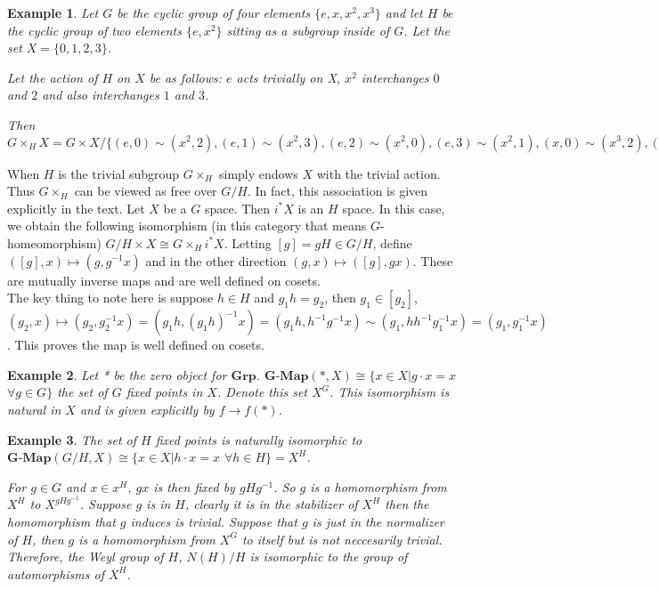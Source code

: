 \documentclass{article}
\theoremstyle{problemstyle}
\theoremstyle{problemstyle}
\theoremstyle{problemstyle}
\newtheorem{example}{Example}
\theoremstyle{problemstyle}
\theoremstyle{problemstyle}
\theoremstyle{problemstyle}
\begin{document}
\begin{example}
Let $G$ be the cyclic group of four elements $\{e,x,x^2,x^3\}$ and let $H$ be the cyclic group of two elements $\{e,x^2\}$ sitting as a subgroup inside of $G$. Let the set $X = \{0,1,2,3\}$. 

Let the action of $H$ on $X$ be as follows: $e$ acts trivially on X, $x^2$ interchanges $0$ and $2$ and also interchanges $1$ and $3$.  

Then $G\times_H X = G\times X / \{(e,0) \sim (x^2,2), (e,1) \sim (x^2,3), (e,2) \sim (x^2,0), (e,3) \sim (x^2,1), (x,0) \sim (x^3,2),(x,1) \sim (x^3,3),(x,2) \sim (x^3,0),(x,3) \sim (x^3,1)\}$
\end{example}

When $H$ is the trivial subgroup $G\times_H$ simply endows $X$ with the trivial action. Thus $G\times_H$ can be viewed as free over $G/H$. In fact, this association is given explicitly in the text. Let $X$ be a $G$ space. Then $i^*X$ is an $H$ space. In this case, we obtain the following isomorphism (in this category that means $G$-homeomorphism) $G/H \times X \cong G\times_H i^*X$. Letting $[g] = gH \in G/H$, define $([g], x) \mapsto (g,g^{-1}x)$ and in the other direction $(g,x) \mapsto ([g],gx)$. These are mutually inverse maps and are well defined on cosets.\\ 

The key thing to note here is suppose $h \in H$ and  $g_1h = g_2$, then $g_1 \in [g_2]$, $(g_2,x) \mapsto (g_2,g_2^{-1}x) = (g_1h,(g_1h)^{-1}x) = (g_1 h,h^{-1 }g^{-1}x) \sim (g_1,hh^{-1}g_1^{-1}x) = (g_1,g_1^{-1}x)$. This proves the map is well defined on cosets. 

\begin{example}
Let * be the zero object for $\textbf{Grp}$. $\textbf{G-Map}(*,X) \cong \{x \in X|g\cdot x = x$ $\forall g \in G\}$ the set of $G$ fixed points in $X$. Denote this set $X^G$. This isomorphism is natural in $X$ and is given explicitly by $f \rightarrow f(*)$.
\end{example}

\begin{example}
The set of $H$ fixed points is naturally isomorphic to $\textbf{G-Map}(G/H,X) \cong \{x \in X|h\cdot x =x$ $\forall h \in H\} = X^H$.

For $g \in G$ and $x \in x^H$, $gx$ is then fixed by $gHg^{-1}$. So $g$ is a homomorphism from $X^H$ to $X^{gHg^{-1}}$. Suppose $g$ is in $H$, clearly it is in the stabilizer of $X^H$ then the homomorphism that $g$ induces is trivial. Suppose that $g$ is just in the normalizer of $H$, then $g$ is a homomorphism from $X^G$ to itself but is not neccesarily trivial. Therefore, the Weyl group of $H$, $N(H)/H$ is isomorphic to the group of automorphisms of $X^H$.
\end{example}
\end{document}
